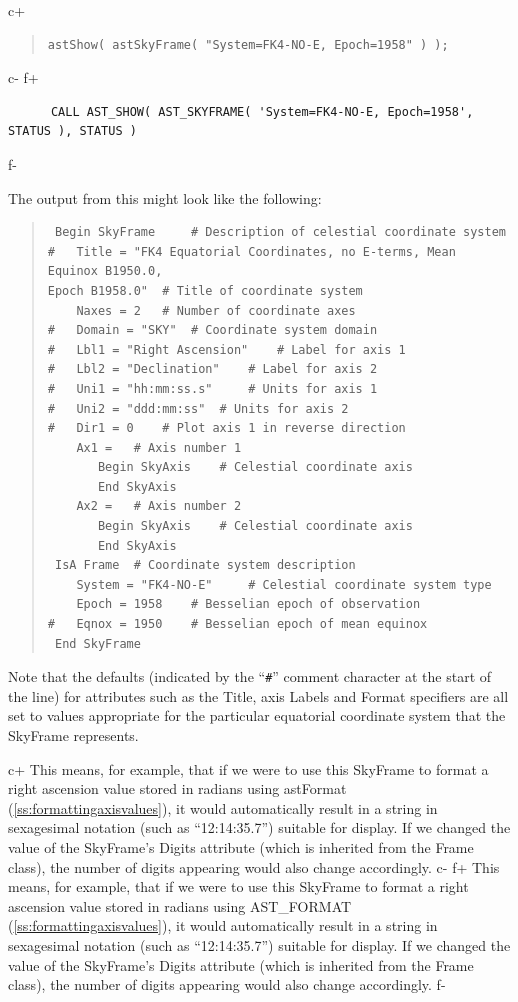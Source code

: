 \documentclass[twoside,11pt]{article}
\newcommand{\secref}[1]{\S\ref{#1}}
\renewcommand{\secref}[1]{\ref{#1}}
\begin{document}
c+
\begin{quote}
\small
\begin{verbatim}
astShow( astSkyFrame( "System=FK4-NO-E, Epoch=1958" ) );
\end{verbatim}
\normalsize
\end{quote}
c-
f+
\small
\begin{verbatim}
      CALL AST_SHOW( AST_SKYFRAME( 'System=FK4-NO-E, Epoch=1958', STATUS ), STATUS )
\end{verbatim}
\normalsize
f-

The output from this might look like the following:

\begin{quote}
\begin{verbatim}
 Begin SkyFrame 	# Description of celestial coordinate system
#   Title = "FK4 Equatorial Coordinates, no E-terms, Mean Equinox B1950.0,
Epoch B1958.0" 	# Title of coordinate system
    Naxes = 2 	# Number of coordinate axes
#   Domain = "SKY" 	# Coordinate system domain
#   Lbl1 = "Right Ascension" 	# Label for axis 1
#   Lbl2 = "Declination" 	# Label for axis 2
#   Uni1 = "hh:mm:ss.s" 	# Units for axis 1
#   Uni2 = "ddd:mm:ss" 	# Units for axis 2
#   Dir1 = 0 	# Plot axis 1 in reverse direction
    Ax1 = 	# Axis number 1
       Begin SkyAxis 	# Celestial coordinate axis
       End SkyAxis
    Ax2 = 	# Axis number 2
       Begin SkyAxis 	# Celestial coordinate axis
       End SkyAxis
 IsA Frame 	# Coordinate system description
    System = "FK4-NO-E" 	# Celestial coordinate system type
    Epoch = 1958 	# Besselian epoch of observation
#   Eqnox = 1950 	# Besselian epoch of mean equinox
 End SkyFrame
\end{verbatim}
\end{quote}

Note that the defaults (indicated by the ``\verb?#?'' comment
character at the start of the line) for attributes such as the Title,
axis Labels and Format specifiers are all set to values appropriate
for the particular equatorial coordinate system that the SkyFrame
represents.

c+
This means, for example, that if we were to use this SkyFrame to
format a right ascension value stored in radians using astFormat
(\secref{ss:formattingaxisvalues}), it would automatically result in a
string in sexagesimal notation (such as ``12:14:35.7'') suitable for
display.  If we changed the value of the SkyFrame's Digits attribute
(which is inherited from the Frame class), the number of digits
appearing would also change accordingly.
c-
f+
This means, for example, that if we were to use this SkyFrame to
format a right ascension value stored in radians using AST\_FORMAT
(\secref{ss:formattingaxisvalues}), it would automatically result in a
string in sexagesimal notation (such as ``12:14:35.7'') suitable for
display.  If we changed the value of the SkyFrame's Digits attribute
(which is inherited from the Frame class), the number of digits
appearing would also change accordingly.
f-
\end{document}
